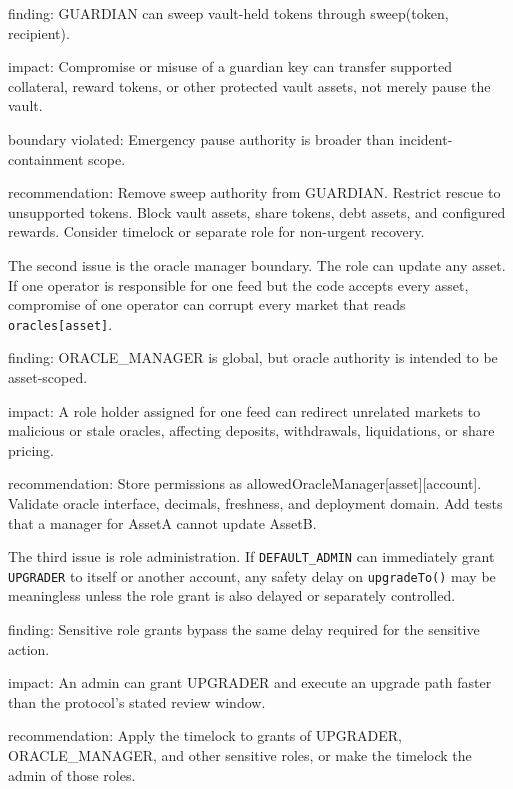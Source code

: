 \begin{codeblock}
finding:
    GUARDIAN can sweep vault-held tokens through sweep(token, recipient).

impact:
    Compromise or misuse of a guardian key can transfer supported collateral,
    reward tokens, or other protected vault assets, not merely pause the vault.

boundary violated:
    Emergency pause authority is broader than incident-containment scope.

recommendation:
    Remove sweep authority from GUARDIAN.
    Restrict rescue to unsupported tokens.
    Block vault assets, share tokens, debt assets, and configured rewards.
    Consider timelock or separate role for non-urgent recovery.
\end{codeblock}

The second issue is the oracle manager boundary. The role can update any asset. If one operator is responsible for one feed but the code accepts every asset, compromise of one operator can corrupt every market that reads \texttt{oracles[asset]}.

\begin{codeblock}
finding:
    ORACLE_MANAGER is global, but oracle authority is intended to be asset-scoped.

impact:
    A role holder assigned for one feed can redirect unrelated markets to
    malicious or stale oracles, affecting deposits, withdrawals, liquidations,
    or share pricing.

recommendation:
    Store permissions as allowedOracleManager[asset][account].
    Validate oracle interface, decimals, freshness, and deployment domain.
    Add tests that a manager for AssetA cannot update AssetB.
\end{codeblock}

The third issue is role administration. If \texttt{DEFAULT\_ADMIN} can immediately grant \texttt{UPGRADER} to itself or another account, any safety delay on \texttt{upgradeTo()} may be meaningless unless the role grant is also delayed or separately controlled.

\begin{codeblock}
finding:
    Sensitive role grants bypass the same delay required for the sensitive action.

impact:
    An admin can grant UPGRADER and execute an upgrade path faster than the
    protocol's stated review window.

recommendation:
    Apply the timelock to grants of UPGRADER, ORACLE_MANAGER, and other
    sensitive roles, or make the timelock the admin of those roles.
\end{codeblock}


